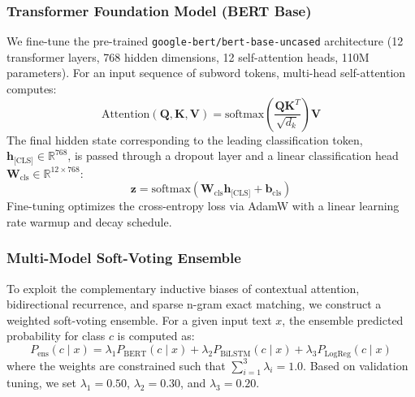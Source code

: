 \documentclass[11pt,a4paper]{article}
\begin{document}
\subsubsection{Transformer Foundation Model (BERT Base)}
We fine-tune the pre-trained \texttt{google-bert/bert-base-uncased} architecture (12 transformer layers, 768 hidden dimensions, 12 self-attention heads, 110M parameters). For an input sequence of subword tokens, multi-head self-attention computes:
\begin{equation}
\text{Attention}(\mathbf{Q}, \mathbf{K}, \mathbf{V}) = \text{softmax}\left(\frac{\mathbf{Q}\mathbf{K}^T}{\sqrt{d_k}}\right)\mathbf{V}
\end{equation}
The final hidden state corresponding to the leading classification token, $\mathbf{h}_{\text{[CLS]}} \in \mathbb{R}^{768}$, is passed through a dropout layer and a linear classification head $\mathbf{W}_{\text{cls}} \in \mathbb{R}^{12 \times 768}$:
\begin{equation}
\mathbf{z} = \text{softmax}(\mathbf{W}_{\text{cls}} \mathbf{h}_{\text{[CLS]}} + \mathbf{b}_{\text{cls}})
\end{equation}
Fine-tuning optimizes the cross-entropy loss via AdamW \cite{loshchilov2019adamw} with a linear learning rate warmup and decay schedule.

\subsubsection{Multi-Model Soft-Voting Ensemble}
To exploit the complementary inductive biases of contextual attention, bidirectional recurrence, and sparse n-gram exact matching, we construct a weighted soft-voting ensemble. For a given input text $x$, the ensemble predicted probability for class $c$ is computed as:
\begin{equation}
P_{\text{ens}}(c \mid x) = \lambda_1 P_{\text{BERT}}(c \mid x) + \lambda_2 P_{\text{BiLSTM}}(c \mid x) + \lambda_3 P_{\text{LogReg}}(c \mid x)
\end{equation}
where the weights are constrained such that $\sum_{i=1}^3 \lambda_i = 1.0$. Based on validation tuning, we set $\lambda_1 = 0.50$, $\lambda_2 = 0.30$, and $\lambda_3 = 0.20$.
\end{document}
